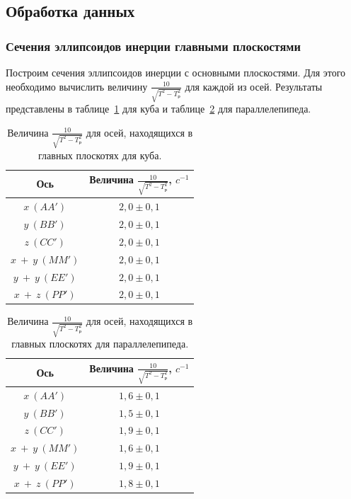 \documentclass[a4paper,11pt]{article}
\begin{document}
\subsection{Обработка данных}
\subsubsection{Сечения эллипсоидов инерции главными плоскостями}
Построим сечения эллипсоидов инерции с основными плоскостями. Для этого необходимо вычислить величину $\frac{10}{\sqrt{T^{2} - T_{р}^{2}}}$ для каждой из осей. Результаты представлены в таблице~\ref{table:tab5} для куба и таблице~\ref{table:tab6} для параллелепипеда.
\begin{table}[h!]
\centering
\begin{tabular}{ ||c|c|| }
  \hline
  Ось & Величина $\frac{10}{\sqrt{T^{2} - T_{р}^{2}}}$, $c^{-1}$ \\
  \hline
  $x\ (AA')$ & $2,0 \pm 0,1$ \\
  $y\ (BB')$ & $2,0 \pm 0,1$ \\
  $z\ (CC')$ & $2,0 \pm 0,1$ \\
  $x\ +\ y\ (MM')$ & $2,0 \pm 0,1$ \\
  $y\ +\ y\ (EE')$ & $2,0 \pm 0,1$ \\
  $x\ +\ z\ (PP')$ & $2,0 \pm 0,1$ \\
  \hline
\end{tabular}
    \caption{Величина $\frac{10}{\sqrt{T^{2} - T_{р}^{2}}}$ для осей, находящихся в главных плоскотях для куба.}
\label{table:tab5}
\end{table}\newline
\begin{table}[h!]
\centering
\begin{tabular}{ ||c|c|| }
  \hline
  Ось & Величина $\frac{10}{\sqrt{T^{2} - T_{р}^{2}}}$, $c^{-1}$ \\
  \hline
  $x\ (AA')$ & $1,6 \pm 0,1$ \\
  $y\ (BB')$ & $1,5 \pm 0,1$ \\
  $z\ (CC')$ & $1,9 \pm 0,1$ \\
  $x\ +\ y\ (MM')$ & $1,6 \pm 0,1$ \\
  $y\ +\ y\ (EE')$ & $1,9 \pm 0,1$ \\
  $x\ +\ z\ (PP')$ & $1,8 \pm 0,1$ \\
  \hline
\end{tabular}
    \caption{Величина $\frac{10}{\sqrt{T^{2} - T_{р}^{2}}}$ для осей, находящихся в главных плоскотях для параллелепипеда.}
\label{table:tab6}
\end{table}\newline
\end{document}

